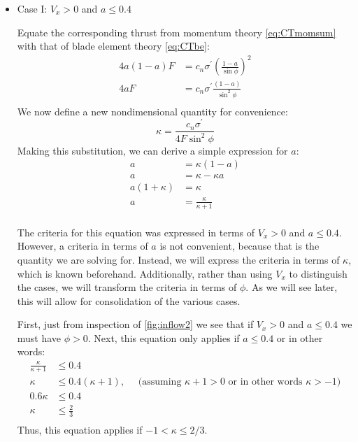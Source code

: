 \documentclass{article}
\begin{document}
\begin{itemize}

\item Case I: $V_x > 0$ and $a \le 0.4$

Equate the corresponding thrust from momentum theory \cref{eq:CTmomsum} with that of blade element theory \cref{eq:CTbe}:
\begin{equation}
    \begin{aligned}
        4 a (1 - a) F &= c_n \sigma^\prime \left(\frac{1-a}{\sin\phi}\right)^2\\
        4 a F &= c_n \sigma^\prime \frac{(1-a)}{\sin^2\phi}\\
    \end{aligned}
\end{equation}
We now define a new nondimensional quantity for convenience:
\begin{equation}
    \kappa = \frac{c_n \sigma^\prime}{4 F \sin^2 \phi}
\end{equation}
Making this substitution, we can derive a simple expression for $a$:
\begin{equation}
    \begin{aligned}
        a &= \kappa (1-a)\\
        a &= \kappa - \kappa a\\
        a (1 + \kappa) &= \kappa\\
        a &= \frac{\kappa}{\kappa + 1}\\
    \end{aligned}
\end{equation}

The criteria for this equation was expressed in terms of $V_x > 0$ and $a \le 0.4$.  However, a criteria in terms of $a$ is not convenient, because that is the quantity we are solving for.  Instead, we will express the criteria in terms of $\kappa$, which is known beforehand.  Additionally, rather than using $V_x$ to distinguish the cases, we will transform the criteria in terms of $\phi$.  As we will see later, this will allow for consolidation of the various cases.

First, just from inspection of \cref{fig:inflow2} we see that if $V_x > 0$ and $a \le 0.4$ we must have $\phi > 0$.  Next, this equation only applies if $a \le 0.4$ or in other words:
\begin{equation}
    \begin{aligned}
        \frac{\kappa}{\kappa + 1} &\le 0.4\\
        \kappa &\le 0.4 (\kappa + 1) ,\quad \text{ (assuming $\kappa + 1 > 0$ or in other words $\kappa > -1$)}\\
        0.6 \kappa &\le 0.4 \\
        \kappa &\le \frac{2}{3} \\
    \end{aligned}
\end{equation}
Thus, this equation applies if $-1 < \kappa \le 2/3$.


\end{itemize}
\end{document}
